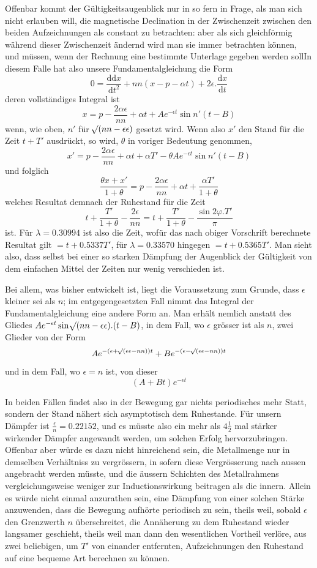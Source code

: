 Offenbar kommt der Gültigkeitsaugenblick nur in so fern in Frage, als man sich nicht erlauben will, die magnetische Declination in der Zwischenzeit zwischen den beiden Aufzeichnungen als constant zu betrachten: aber als sich gleichförmig während dieser Zwischenzeit ändernd wird man sie immer betrachten können, und müssen, wenn der Rechnung eine bestimmte Unterlage gegeben werden soll\quad In diesem Falle hat also unsere Fundamentalgleichung die Form
\[
0=\frac{\mathrm{d}\mathrm{d}x}{\mathrm{d}t^2}+nn(x-p-\alpha t)+2\epsilon.\frac{\mathrm{d}x}{\mathrm{d}t}
\]
deren vollständiges Integral ist
\[
x=p-\frac{2\alpha\epsilon}{nn}+\alpha t+Ae^{-\epsilon t}\sin n'(t-B)
\]
wenn, wie oben, $n'$ für $\mathord{{}^{}\!\surd}(nn-\epsilon\epsilon)$ gesetzt wird. Wenn also $x'$ den Stand für die Zeit $t+T'$ ausdrückt, so wird, $\theta$ in voriger Bedeutung genommen,
\[
x'=p-\frac{2\alpha\epsilon}{nn}+\alpha t+\alpha T'-\theta Ae^{-\epsilon t}\sin n'(t-B)
\]
und folglich
\[
\frac{\theta x+x'}{1+\theta}=p-\frac{2\alpha\epsilon}{nn}+\alpha t+\frac{\alpha T'}{1+\theta}
\]
welches Resultat demnach der Ruhestand für die Zeit
\[
t+\frac{T'}{1+\theta}-\frac{2\epsilon}{nn}=t+\frac{T'}{1+\theta}-\frac{\sin2\varphi.T'}{\pi}
\]
ist. Für $\lambda=0.30994$ ist also die Zeit, wofür das nach obiger Vorschrift berechnete Resultat gilt $=t+0.5337T'$, für $\lambda=0.33570$ hingegen $=t+0.5365T'$.
Man sieht also, dass selbst bei einer so starken Dämpfung der Augenblick der Gültigkeit von dem einfachen Mittel der Zeiten nur wenig verschieden ist.

Bei allem, was bisher entwickelt ist, liegt die Voraussetzung zum Grunde, dass $\epsilon$ kleiner sei als $n$; im entgegengesetzten Fall nimmt das Integral der Fundamentalgleichung eine andere Form an. Man erhält nemlich anstatt des Gliedes $Ae^{-\epsilon t}\sin\mathord{{}^{}\!\surd}(nn-\epsilon\epsilon).(t-B)$, in dem Fall, wo $\epsilon$ grösser ist als $n$, zwei Glieder von der Form
\[
Ae^{-(\epsilon+\mathord{{}^{}\!\surd}(\epsilon\epsilon-nn))t}+Be^{-(\epsilon-\mathord{{}^{}\!\surd}(\epsilon\epsilon-nn))t}
\]
und in dem Fall, wo $\epsilon=n$ ist, von dieser
\[
(A+Bt)e^{-\epsilon t}
\]

In beiden Fällen findet also in der Bewegung gar nichts periodisches mehr Statt, sondern der Stand nähert sich asymptotisch dem Ruhestande. Für unsern Dämpfer ist $\frac{\epsilon}{n}=0.22152$, und es müsste also ein mehr als $4\tfrac12$ mal stärker wirkender Dämpfer angewandt werden, um solchen Erfolg hervorzubringen. Offenbar aber würde es dazu nicht hinreichend sein, die Metallmenge nur in demselben Verhältniss zu vergrössern, in sofern diese Vergrösserung nach aussen angebracht werden müsste, und die äussern Schichten des Metallrahmens vergleichungsweise weniger zur Inductionswirkung beitragen als die innern. Allein es würde nicht einmal anzurathen sein, eine Dämpfung von einer solchen Stärke anzuwenden, dass die Bewegung aufhörte periodisch zu sein, theils weil, sobald $\epsilon$ den Grenzwerth $n$ überschreitet, die Annäherung zu dem Ruhestand wieder langsamer geschieht, theils weil man dann den wesentlichen Vortheil verlöre, aus zwei beliebigen, um $T'$ von einander entfernten, Aufzeichnungen den Ruhestand auf eine bequeme Art berechnen zu können.

